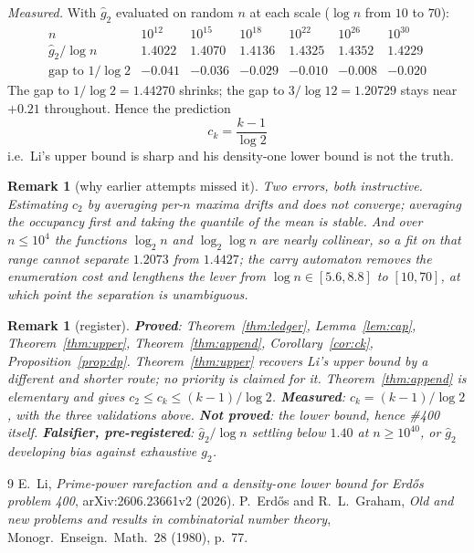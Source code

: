 \documentclass[11pt]{article}
\newtheorem{remark}[theorem]{Remark}
\begin{document}
\emph{Measured.}  With $\widehat g_2$ evaluated on random $n$ at each scale
($\log n$ from $10$ to $70$):
\[
\begin{array}{r|cccccc}
 n & 10^{12} & 10^{15} & 10^{18} & 10^{22} & 10^{26} & 10^{30}\\\hline
 \widehat g_2/\log n & 1.4022 & 1.4070 & 1.4136 & 1.4325 & 1.4352 & 1.4229\\
 \text{gap to }1/\log2 & -0.041 & -0.036 & -0.029 & -0.010 & -0.008 & -0.020
\end{array}
\]
The gap to $1/\log2=1.44270$ shrinks; the gap to $3/\log12=1.20729$ stays near $+0.21$
throughout.  Hence the prediction
\[
  \boxed{\ c_k=\frac{k-1}{\log 2}\ }
\]
i.e.\ Li's upper bound is sharp and his density-one lower bound is not the truth.

\begin{remark}[why earlier attempts missed it]
Two errors, both instructive.  Estimating $c_2$ by averaging per-$n$ maxima drifts and does
not converge; averaging the occupancy \emph{first} and taking the quantile of the mean is
stable.  And over $n\le10^4$ the functions $\log_2n$ and $\log_2\log n$ are nearly
collinear, so a fit on that range cannot separate $1.2073$ from $1.4427$; the carry
automaton removes the enumeration cost and lengthens the lever from
$\log n\in[5.6,8.8]$ to $[10,70]$, at which point the separation is unambiguous.
\end{remark}

\begin{remark}[register]
\textbf{Proved}: Theorem~\ref{thm:ledger}, Lemma~\ref{lem:cap},
Theorem~\ref{thm:upper}, Theorem~\ref{thm:append}, Corollary~\ref{cor:ck},
Proposition~\ref{prop:dp}.  Theorem~\ref{thm:upper} recovers Li's
upper bound by a different and shorter route; no priority is claimed for it.
Theorem~\ref{thm:append} is elementary and gives $c_2\le c_k\le(k-1)/\log2$.
\textbf{Measured}: $c_k=(k-1)/\log2$, with the three validations above.
\textbf{Not proved}: the lower bound, hence \#400 itself.
\textbf{Falsifier, pre-registered}: $\widehat g_2/\log n$ settling below $1.40$ at
$n\ge10^{40}$, or $\widehat g_2$ developing bias against exhaustive $g_2$.
\end{remark}

\begin{thebibliography}{9}
 E.\ Li, \emph{Prime-power rarefaction and a density-one lower bound for
Erd\H{o}s problem 400}, arXiv:2606.23661v2 (2026).
 P.\ Erd\H{o}s and R.\ L.\ Graham, \emph{Old and new problems and results
in combinatorial number theory}, Monogr.\ Enseign.\ Math.\ 28 (1980), p.~77.
\end{thebibliography}
\end{document}

